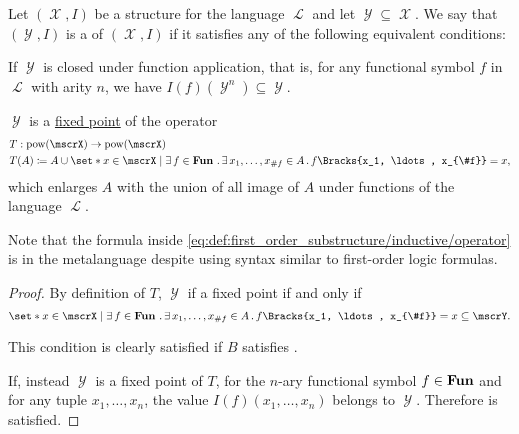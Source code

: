 \begin{definition}\label{def:first_order_substructure}
  Let \( (\mscrX, I) \) be a structure for the language \( \mscrL \) and let \( \mscrY \subseteq \mscrX \). We say that \( (\mscrY, I) \) is a  of \( (\mscrX, I) \) if it satisfies any of the following equivalent conditions:

  \begin{thmenum}
     If \( \mscrY \) is closed under function application, that is, for any functional symbol \( f \) in \( \mscrL \) with arity \( n \), we have \( I(f)(\mscrY^n) \subseteq \mscrY \).

     \( \mscrY \) is a \hyperref[def:fixed_point]{fixed point} of the operator
    \begin{equation}\label{eq:def:first_order_substructure/inductive/operator}
      \begin{aligned}
        &T: \pow(\mscrX) \to \pow(\mscrX) \\
        &T(A) \coloneqq A \cup \set*{ x \in \mscrX \given \qexists{f \in \boldop{Fun}} \qexists{x_1, \ldots, x_{\#f} \in A} f\Bracks{x_1, \ldots, x_{\#f}} = x },
      \end{aligned}
    \end{equation}
    which enlarges \( A \) with the union of all image of \( A \) under functions of the language \( \mscrL \).

    Note that the formula inside \eqref{eq:def:first_order_substructure/inductive/operator} is in the metalanguage despite using syntax similar to first-order logic formulas.
  \end{thmenum}
\end{definition}
\begin{proof}
  By definition of \( T \), \( \mscrY \) if a fixed point if and only if
  \begin{equation*}
    \set*{ x \in \mscrX \given \qexists{f \in \boldop{Fun}} \qexists{x_1, \ldots, x_{\#f} \in A} f\Bracks{x_1, \ldots, x_{\#f}} = x } \subseteq \mscrY.
  \end{equation*}

  This condition is clearly satisfied if \( B \) satisfies .

  If, instead \( \mscrY \) is a fixed point of \( T \), for the \( n \)-ary functional symbol \( f \in \operatorname{\mathbf{Fun}} \) and for any tuple \( x_1, \ldots, x_n \), the value \( I(f)(x_1, \ldots, x_n) \) belongs to \( \mscrY \). Therefore  is satisfied.
\end{proof}

